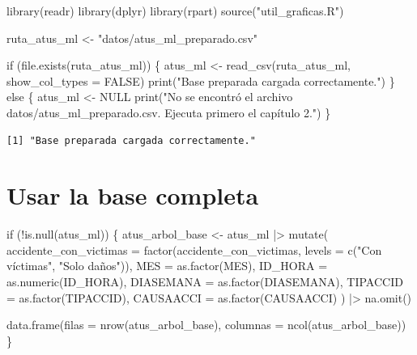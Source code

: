 \documentclass[
  spanish,
  11pt,
  letterpaper,
]{book}
\newenvironment{Shaded}{}{}
\newcommand{\AttributeTok}[1]{\textcolor[rgb]{0.84,0.23,0.29}{#1}}
\newcommand{\ConstantTok}[1]{\textcolor[rgb]{0.00,0.36,0.77}{#1}}
\newcommand{\ControlFlowTok}[1]{\textcolor[rgb]{0.84,0.23,0.29}{#1}}
\newcommand{\FunctionTok}[1]{\textcolor[rgb]{0.44,0.26,0.76}{#1}}
\newcommand{\NormalTok}[1]{\textcolor[rgb]{0.14,0.16,0.18}{#1}}
\newcommand{\OtherTok}[1]{\textcolor[rgb]{0.44,0.26,0.76}{#1}}
\newcommand{\SpecialCharTok}[1]{\textcolor[rgb]{0.00,0.36,0.77}{#1}}
\newcommand{\StringTok}[1]{\textcolor[rgb]{0.01,0.18,0.38}{#1}}
\begin{document}
\begin{Shaded}
\begin{Highlighting}[]
\FunctionTok{library}\NormalTok{(readr)}
\FunctionTok{library}\NormalTok{(dplyr)}
\FunctionTok{library}\NormalTok{(rpart)}
\FunctionTok{source}\NormalTok{(}\StringTok{"util\_graficas.R"}\NormalTok{)}

\NormalTok{ruta\_atus\_ml }\OtherTok{\textless{}{-}} \StringTok{"datos/atus\_ml\_preparado.csv"}

\ControlFlowTok{if}\NormalTok{ (}\FunctionTok{file.exists}\NormalTok{(ruta\_atus\_ml)) \{}
\NormalTok{  atus\_ml }\OtherTok{\textless{}{-}} \FunctionTok{read\_csv}\NormalTok{(ruta\_atus\_ml, }\AttributeTok{show\_col\_types =} \ConstantTok{FALSE}\NormalTok{)}
  \FunctionTok{print}\NormalTok{(}\StringTok{"Base preparada cargada correctamente."}\NormalTok{)}
\NormalTok{\} }\ControlFlowTok{else}\NormalTok{ \{}
\NormalTok{  atus\_ml }\OtherTok{\textless{}{-}} \ConstantTok{NULL}
  \FunctionTok{print}\NormalTok{(}\StringTok{"No se encontró el archivo datos/atus\_ml\_preparado.csv. Ejecuta primero el capítulo 2."}\NormalTok{)}
\NormalTok{\}}
\end{Highlighting}
\end{Shaded}

\begin{verbatim}
[1] "Base preparada cargada correctamente."
\end{verbatim}

\section{Usar la base completa}\label{usar-la-base-completa}

\begin{Shaded}
\begin{Highlighting}[]
\ControlFlowTok{if}\NormalTok{ (}\SpecialCharTok{!}\FunctionTok{is.null}\NormalTok{(atus\_ml)) \{}
\NormalTok{  atus\_arbol\_base }\OtherTok{\textless{}{-}}\NormalTok{ atus\_ml }\SpecialCharTok{|\textgreater{}}
    \FunctionTok{mutate}\NormalTok{(}
      \AttributeTok{accidente\_con\_victimas =} \FunctionTok{factor}\NormalTok{(accidente\_con\_victimas, }\AttributeTok{levels =} \FunctionTok{c}\NormalTok{(}\StringTok{"Con víctimas"}\NormalTok{, }\StringTok{"Solo daños"}\NormalTok{)),}
      \AttributeTok{MES =} \FunctionTok{as.factor}\NormalTok{(MES),}
      \AttributeTok{ID\_HORA =} \FunctionTok{as.numeric}\NormalTok{(ID\_HORA),}
      \AttributeTok{DIASEMANA =} \FunctionTok{as.factor}\NormalTok{(DIASEMANA),}
      \AttributeTok{TIPACCID =} \FunctionTok{as.factor}\NormalTok{(TIPACCID),}
      \AttributeTok{CAUSAACCI =} \FunctionTok{as.factor}\NormalTok{(CAUSAACCI)}
\NormalTok{    ) }\SpecialCharTok{|\textgreater{}}
    \FunctionTok{na.omit}\NormalTok{()}

  \FunctionTok{data.frame}\NormalTok{(}\AttributeTok{filas =} \FunctionTok{nrow}\NormalTok{(atus\_arbol\_base), }\AttributeTok{columnas =} \FunctionTok{ncol}\NormalTok{(atus\_arbol\_base))}
\NormalTok{\}}
\end{Highlighting}
\end{Shaded}
\end{document}
